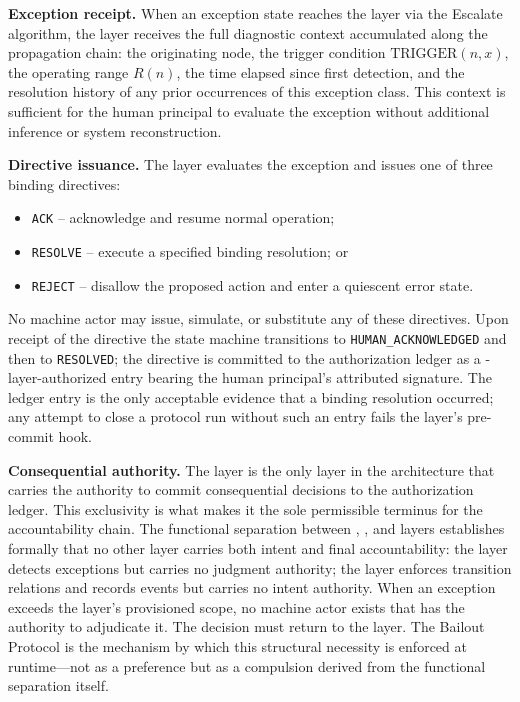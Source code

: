 \medskip\noindent\textbf{Exception receipt.} When an exception state reaches the
\purpose{} layer via the Escalate algorithm, the layer receives the full diagnostic
context accumulated along the propagation chain: the originating node, the trigger
condition $\text{TRIGGER}(n, x)$, the operating range $R(n)$, the time elapsed since
first detection, and the resolution history of any prior occurrences of this exception
class. This context is sufficient for the human principal to evaluate the exception
without additional inference or system reconstruction.

\medskip\noindent\textbf{Directive issuance.} The \purpose{} layer evaluates the
exception and issues one of three binding directives:
\begin{itemize}\itemsep=0pt
\item \texttt{ACK} -- acknowledge and resume normal operation;
\item \texttt{RESOLVE} -- execute a specified binding resolution; or
\item \texttt{REJECT} -- disallow the proposed action and enter a quiescent error state.
\end{itemize}
No machine actor may issue, simulate, or substitute any of these directives. Upon
receipt of the directive the state machine transitions to \texttt{HUMAN\_ACKNOWLEDGED}
and then to \texttt{RESOLVED}; the directive is committed to the authorization ledger
as a \purpose-layer-authorized entry bearing the human principal's attributed signature.
The ledger entry is the only acceptable evidence that a binding resolution occurred;
any attempt to close a protocol run without such an entry fails the \fact{} layer's
pre-commit hook.

\medskip\noindent\textbf{Consequential authority.} The \purpose{} layer is the only
layer in the \bxthree{} architecture that carries the authority to commit consequential
decisions to the authorization ledger. This exclusivity is what makes it the sole
permissible terminus for the accountability chain. The functional separation between
\purpose{}, \bounds{}, and \fact{} layers establishes formally that no other layer
carries both intent and final accountability: the \bounds{} layer detects exceptions
but carries no judgment authority; the \fact{} layer enforces transition relations and
records events but carries no intent authority. When an exception exceeds the
\bounds{} layer's provisioned scope, no machine actor exists that has the authority
to adjudicate it. The decision must return to the \purpose{} layer. The Bailout Protocol
is the mechanism by which this structural necessity is enforced at runtime---not as a
preference but as a compulsion derived from the functional separation itself.

